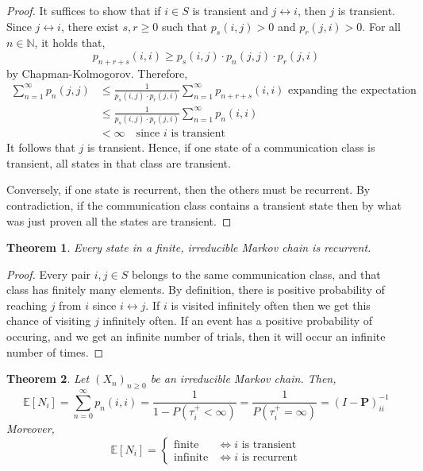 \documentclass{tufte-handout}
\newtheorem{thm}{Theorem}
\begin{document}
  \begin{proof}
    It suffices to show that if $i \in S$ is transient and $j \leftrightarrow i$, then $j$ is transient. Since $j \leftrightarrow i$, there exist $s,r \geq 0$ such that $p_s(i,j) > 0$ and $p_r(j,i) > 0$. For all $n \in \mathbb{N}$, it holds that,
    \[p_{n+r+s}(i,i) \geq p_{s}(i,j) \cdot p_{n}(j,j) \cdot p_{r}(j,i)\]
    \noindent by Chapman-Kolmogorov. Therefore,
    \begin{align*}
      \sum_{n=1}^{\infty} p_{n}(j,j) &\leq \frac{1}{p_{s}(i,j) \cdot p_{r}(j,i)} \sum_{n=1}^{\infty} p_{n+r+s}(i,i) \text{ expanding the expectation} \\ &\leq \frac{1}{p_{s}(i,j) \cdot p_{r}(j,i)} \sum_{n=1}^{\infty} p_{n}(i,i) \\
      &<\infty \quad \text{since $i$ is transient}
    \end{align*}
    \noindent It follows that $j$ is transient. Hence, if one state of a communication class is transient, all states in that class are transient.

    Conversely, if one state is recurrent, then the others must be recurrent. By contradiction, if the communication class contains a transient state then by what was just proven all the states are transient.
  \end{proof}

  \begin{thm}
    Every state in a finite, irreducible Markov chain is recurrent.
  \end{thm}

  \begin{proof}
    Every pair $i, j \in S$ belongs to the same communication class, and that class has finitely many elements. By definition, there is positive probability of reaching $j$ from $i$ since $i \leftrightarrow j$. If $i$ is visited infinitely often then we get this chance of visiting $j$ infinitely often. If an event has a positive probability of occuring, and we get an infinite number of trials, then it will occur an infinite number of times.
  \end{proof}

  \begin{thm}
    Let $(X_n)_{n \geq 0}$ be an irreducible Markov chain. Then,
    \[\mathbb{E}[N_i]  = \sum_{n=0}^\infty p_n(i,i)
                       = \frac{1}{1 - P(\tau^+_i < \infty)}
                       = \frac{1}{P(\tau^+_i = \infty)}
                       = (I - \boldsymbol{P})_{ii}^{-1}\]
    \noindent Moreover,
    \[\mathbb{E}[N_i] = \begin{cases}
                          \text{finite} & \text{$\iff i$ is transient} \\
                          \text{infinite} & \text{$\iff i$ is recurrent}
                        \end{cases}\]
  \end{thm}
\end{document}
